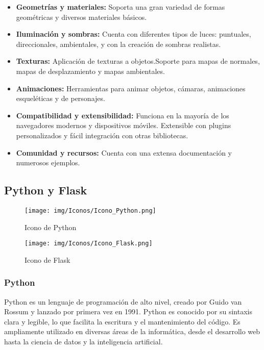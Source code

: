\documentclass[a4paper, 12pt]{book}
\begin{document}
    \begin{itemize} 
        \item \textbf{Geometrías y materiales:} Soporta una gran variedad de formas geométricas y diversos materiales básicos.    
        \item \textbf{Iluminación y sombras:} Cuenta con diferentes tipos de luces: puntuales, direccionales, ambientales, y con la creación de sombras realistas.    
        \item \textbf{Texturas:} Aplicación de texturas a objetos.Soporte para mapas de normales, mapas de desplazamiento y mapas ambientales.    
        \item \textbf{Animaciones:} Herramientas para animar objetos, cámaras, animaciones esqueléticas y de personajes.    
        \item \textbf{Compatibilidad y extensibilidad:} Funciona en la mayoría de los navegadores modernos y dispositivos móviles. Extensible con plugins personalizados y fácil integración con otras bibliotecas.    
        \item \textbf{Comunidad y recursos:} Cuenta con una extensa documentación y numerosos ejemplos.
    \end{itemize}

  

    \subsection{Python y Flask}
        \begin{figure}[H]
            \centering
            \begin{minipage}{0.45\textwidth}
                \centering
                \texttt{[image: img/Iconos/Icono\_Python.png]}
                \caption{Icono de Python}
                \label{fig:otra-imagen}
            \end{minipage}
            \begin{minipage}{0.45\textwidth}
                \centering
                \texttt{[image: img/Iconos/Icono\_Flask.png]}
                \caption{Icono de Flask}
                \label{fig:html-css-js}
            \end{minipage}\hfill
        \end{figure}

        \subsubsection{Python}
        Python\cite{PythonWikibooks,knowltonPython} es un lenguaje de programación de alto nivel, creado por Guido van Rossum y lanzado por primera vez en 1991. Python es conocido por su sintaxis clara y legible, lo que facilita la escritura y el mantenimiento del código. Es ampliamente utilizado en diversas áreas de la informática, desde el desarrollo web hasta la ciencia de datos y la inteligencia artificial.
        
\end{document}
